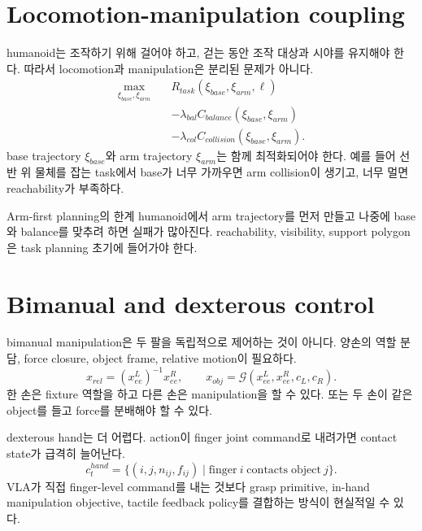 \section{Locomotion-manipulation coupling}

humanoid는 조작하기 위해 걸어야 하고, 걷는 동안 조작 대상과 시야를 유지해야 한다. 따라서 locomotion과 manipulation은 분리된 문제가 아니다.
\begin{equation}
  \begin{aligned}
  \max_{\xi_{base}, \xi_{arm}}\quad
  &R_{task}(\xi_{base},\xi_{arm},\ell)\\
  &-\lambda_{bal} C_{balance}(\xi_{base},\xi_{arm})\\
  &-\lambda_{col} C_{collision}(\xi_{base},\xi_{arm}).
  \end{aligned}
  \label{eq:ch20-loco-manip}
\end{equation}
base trajectory $\xi_{base}$와 arm trajectory $\xi_{arm}$는 함께 최적화되어야 한다. 예를 들어 선반 위 물체를 잡는 task에서 base가 너무 가까우면 arm collision이 생기고, 너무 멀면 reachability가 부족하다.

\begin{warningbox}{Arm-first planning의 한계}
humanoid에서 arm trajectory를 먼저 만들고 나중에 base와 balance를 맞추려 하면 실패가 많아진다. reachability, visibility, support polygon은 task planning 초기에 들어가야 한다.
\end{warningbox}

\section{Bimanual and dexterous control}

bimanual manipulation은 두 팔을 독립적으로 제어하는 것이 아니다. 양손의 역할 분담, force closure, object frame, relative motion이 필요하다.
\begin{equation}
  x_{rel}
  =
  (x_{ee}^{L})^{-1} x_{ee}^{R},
  \qquad
  x_{obj}
  =
  \mathcal{G}(x_{ee}^{L},x_{ee}^{R},c_L,c_R).
  \label{eq:ch20-bimanual}
\end{equation}
한 손은 fixture 역할을 하고 다른 손은 manipulation을 할 수 있다. 또는 두 손이 같은 object를 들고 force를 분배해야 할 수 있다.

dexterous hand는 더 어렵다. action이 finger joint command로 내려가면 contact state가 급격히 늘어난다.
\begin{equation}
  c_t^{hand}
  =
  \{
  (i,j,n_{ij},f_{ij})
  \mid
  \mathrm{finger}\ i
  \;\mathrm{contacts}\;
  \mathrm{object}\ j
  \}.
  \label{eq:ch20-hand-contact}
\end{equation}
VLA가 직접 finger-level command를 내는 것보다 grasp primitive, in-hand manipulation objective, tactile feedback policy를 결합하는 방식이 현실적일 수 있다.


